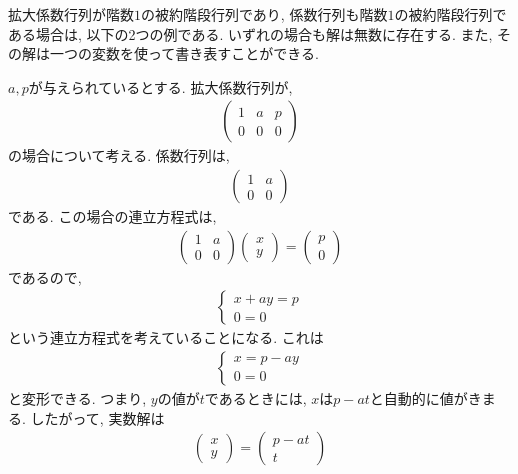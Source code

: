 拡大係数行列が階数$1$の被約階段行列であり,
係数行列も階数$1$の被約階段行列である場合は,
以下の2つの例である.
いずれの場合も解は無数に存在する.
また, その解は一つの変数を使って書き表すことができる.
\begin{example}
  \label{eg:eq:reduced:4}
  $a,p$が与えられているとする.
  拡大係数行列が,
  \begin{align*}
    \begin{pmatrix}
      1&a&p\\0&0&0
    \end{pmatrix}
  \end{align*}
  の場合について考える.
  係数行列は,
  \begin{align*}
    \begin{pmatrix}
      1&a\\0&0
    \end{pmatrix}
  \end{align*}
  である.
  この場合の連立方程式は,
  \begin{align*}
    \begin{pmatrix}
      1&a\\0&0
    \end{pmatrix}
    \begin{pmatrix}x\\y\end{pmatrix}
      =
      \begin{pmatrix}
        p\\0
      \end{pmatrix}
  \end{align*}
  であるので,
  \begin{align*}
    \begin{cases}
      x+ay=p\\
      0=0
    \end{cases}
  \end{align*}
  という連立方程式を考えていることになる.
  これは
  \begin{align*}
    \begin{cases}
      x=p-ay\\
      0=0
    \end{cases}
  \end{align*}
  と変形できる.
  つまり, $y$の値が$t$であるときには,
  $x$は$p-at$と自動的に値がきまる.
  したがって, 実数解は
  \begin{align*}
    \begin{pmatrix}x\\y\end{pmatrix}
      =
      \begin{pmatrix}p-at\\t\end{pmatrix}

\end{align*}
\end{example}
